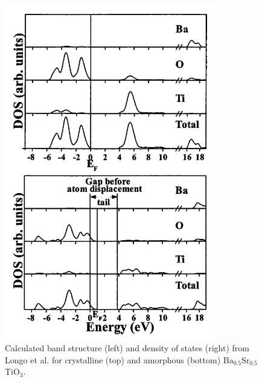 \documentclass[3p,review,12pt]{elsarticle}
\begin{document}
\begin{figure}[H]
\begin{minipage}[b]{0.45\textwidth}
		\includegraphics[width=0.82\textwidth]{longo2}
		\centering
	\end{minipage}
	\caption{Calculated band structure (left) and density of states (right) from Longo et al. \cite{Longo2004} for crystalline (top) and amorphous (bottom) Ba$_{0.5}$Sr$_{0.5}$TiO$_{3}$.}
\end{figure}
\end{document}
